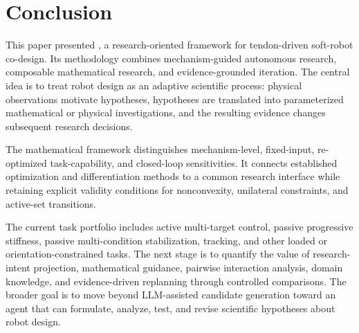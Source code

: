 \section{Conclusion}
\label{sec:conclusion}

This paper presented \softrobotagent{}, a research-oriented framework for tendon-driven soft-robot co-design. Its methodology combines mechanism-guided autonomous research, composable mathematical research, and evidence-grounded iteration. The central idea is to treat robot design as an adaptive scientific process: physical observations motivate hypotheses, hypotheses are translated into parameterized mathematical or physical investigations, and the resulting evidence changes subsequent research decisions.

The mathematical framework distinguishes mechanism-level, fixed-input, re-optimized task-capability, and closed-loop sensitivities. It connects established optimization and differentiation methods to a common research interface while retaining explicit validity conditions for nonconvexity, unilateral constraints, and active-set transitions.

The current task portfolio includes active multi-target control, passive progressive stiffness, passive multi-condition stabilization, tracking, and other loaded or orientation-constrained tasks. The next stage is to quantify the value of research-intent projection, mathematical guidance, pairwise interaction analysis, domain knowledge, and evidence-driven replanning through controlled comparisons. The broader goal is to move beyond LLM-assisted candidate generation toward an agent that can formulate, analyze, test, and revise scientific hypotheses about robot design.
